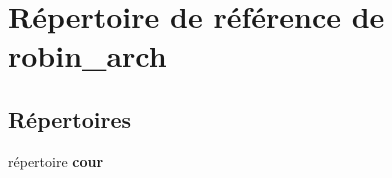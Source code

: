 \section{Répertoire de référence de robin\-\_\-arch}
\label{dir_76c3c4b4b88183ace3b846b203416639}
\subsection*{Répertoires}
\begin{DoxyCompactItemize}
\item 
répertoire {\bf cour}
\end{DoxyCompactItemize}
